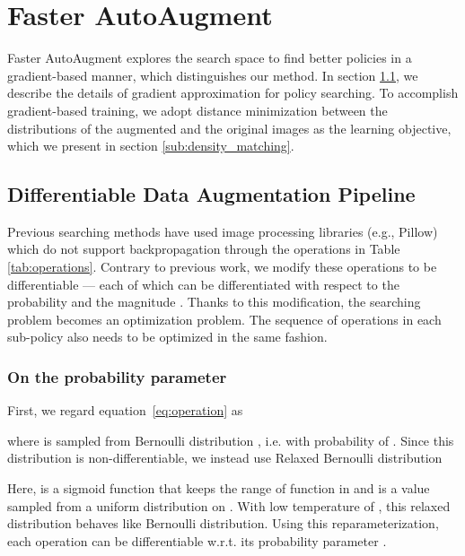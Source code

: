 \documentclass[10pt,twocolumn,letterpaper]{article}
\def\eqref#1{equation~\ref{#1}}
\newcommand{\Tabref}[1]{Table \ref{#1}}
\newcommand{\autoaugment}{AutoAugment\xspace}
\newcommand{\faster}{Faster \autoaugment}
\begin{document}
\section{\faster}\label{sec:faster_auto_augment}


\faster explores the search space to find better policies in a gradient-based manner, which distinguishes our method. In section \ref{sub:differentiable_da}, we describe the details of gradient approximation for policy searching. To accomplish gradient-based training, we adopt distance minimization between the distributions of the augmented and the original images as the learning objective, which we present in section \ref{sub:density_matching}.



\subsection{Differentiable Data Augmentation Pipeline}\label{sub:differentiable_da}

Previous searching methods \cite{Cubuk2018,Ho2019,Lim2019} have used image processing libraries (e.g., Pillow) which do not support backpropagation through the operations in \Tabref{tab:operations}. Contrary to previous work, we modify these operations to be differentiable --- each of which can be differentiated with respect to the probability  and the magnitude . Thanks to this modification, the searching problem becomes an optimization problem. The sequence of operations in each sub-policy also needs to be optimized in the same fashion.

\subsubsection*{On the probability parameter }

First, we regard \eqref{eq:operation} as 



\noindent where  is sampled from Bernoulli distribution , i.e.  with probability of . Since this distribution is non-differentiable, we instead use Relaxed Bernoulli distribution \cite{Jang2016}



Here,  is a sigmoid function that keeps the range of function in  and  is a value sampled from a uniform distribution on . With low temperature of , this relaxed distribution behaves like Bernoulli distribution. Using this reparameterization, each operation  can be differentiable w.r.t. its probability parameter .
\end{document}
